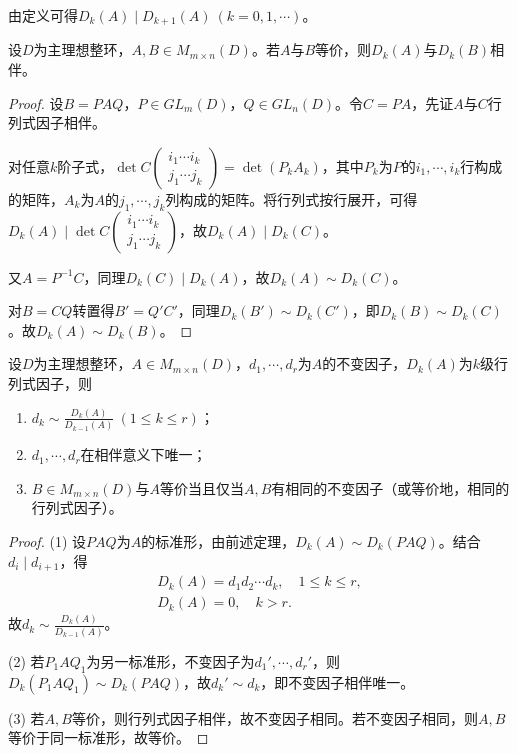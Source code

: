 \documentclass[../../main.tex]{subfiles}%
\begin{document}
\begin{remark}
由定义可得$D_k(A)\mid D_{k+1}(A)\ (k=0,1,\cdots)$。
\end{remark}

\begin{theorem}
设$D$为主理想整环，$A,B\in M_{m\times n}(D)$。若$A$与$B$等价，则$D_k(A)$与$D_k(B)$相伴。
\end{theorem}

\begin{proof}

设$B=PAQ$，$P\in GL_m(D)$，$Q\in GL_n(D)$。令$C=PA$，先证$A$与$C$行列式因子相伴。

对任意$k$阶子式，$\det C\begin{pmatrix}i_1\cdots i_k\\j_1\cdots j_k\end{pmatrix}=\det(P_kA_k)$，其中$P_k$为$P$的$i_1,\cdots,i_k$行构成的矩阵，$A_k$为$A$的$j_1,\cdots,j_k$列构成的矩阵。将行列式按行展开，可得$D_k(A)\mid\det C\begin{pmatrix}i_1\cdots i_k\\j_1\cdots j_k\end{pmatrix}$，故$D_k(A)\mid D_k(C)$。

又$A=P^{-1}C$，同理$D_k(C)\mid D_k(A)$，故$D_k(A)\sim D_k(C)$。

对$B=CQ$转置得$B'=Q'C'$，同理$D_k(B')\sim D_k(C')$，即$D_k(B)\sim D_k(C)$。故$D_k(A)\sim D_k(B)$。

\end{proof}

\begin{theorem}
设$D$为主理想整环，$A\in M_{m\times n}(D)$，$d_1,\cdots,d_r$为$A$的不变因子，$D_k(A)$为$k$级行列式因子，则
\begin{enumerate}[(1)]
\item $d_k\sim\frac{D_k(A)}{D_{k-1}(A)}\ (1\leqslant k\leqslant r)$；
\item $d_1,\cdots,d_r$在相伴意义下唯一；
\item $B\in M_{m\times n}(D)$与$A$等价当且仅当$A,B$有相同的不变因子（或等价地，相同的行列式因子）。
\end{enumerate}
\end{theorem}

\begin{proof}

(1) 设$PAQ$为$A$的标准形，由前述定理，$D_k(A)\sim D_k(PAQ)$。结合$d_i\mid d_{i+1}$，得
\begin{align*}
D_k(A)=d_1d_2\cdots d_k,\quad 1\leqslant k\leqslant r,\\
D_k(A)=0,\quad k>r.
\end{align*}
故$d_k\sim\frac{D_k(A)}{D_{k-1}(A)}$。

(2) 若$P_1AQ_1$为另一标准形，不变因子为$d_1',\cdots,d_r'$，则$D_k(P_1AQ_1)\sim D_k(PAQ)$，故$d_k'\sim d_k$，即不变因子相伴唯一。

(3) 若$A,B$等价，则行列式因子相伴，故不变因子相同。若不变因子相同，则$A,B$等价于同一标准形，故等价。

\end{proof}
\end{document}
